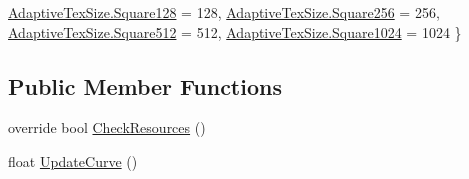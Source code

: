 \begin{DoxyCompactItemize}
\mbox{\hyperlink{class_unity_standard_assets_1_1_image_effects_1_1_tonemapping_affa06af2bce28037fc1882c70b7b2131aa5d347397bfa7f27b50411a62497793c}{Adaptive\+Tex\+Size.\+Square128}} = 128, 
\newline
\mbox{\hyperlink{class_unity_standard_assets_1_1_image_effects_1_1_tonemapping_affa06af2bce28037fc1882c70b7b2131a6f3236873f8f65d77055d9963e4573bd}{Adaptive\+Tex\+Size.\+Square256}} = 256, 
\mbox{\hyperlink{class_unity_standard_assets_1_1_image_effects_1_1_tonemapping_affa06af2bce28037fc1882c70b7b2131a66170e3867878ce0df9d4367b160b197}{Adaptive\+Tex\+Size.\+Square512}} = 512, 
\mbox{\hyperlink{class_unity_standard_assets_1_1_image_effects_1_1_tonemapping_affa06af2bce28037fc1882c70b7b2131a1028496b30aad1a6c74a169c2eb043a3}{Adaptive\+Tex\+Size.\+Square1024}} = 1024
 \}
\end{DoxyCompactItemize}
\subsection*{Public Member Functions}
\begin{DoxyCompactItemize}
\item 
override bool \mbox{\hyperlink{class_unity_standard_assets_1_1_image_effects_1_1_tonemapping_a2e9b0425c0f9ee9abe087130789ab8b8}{Check\+Resources}} ()
\item 
float \mbox{\hyperlink{class_unity_standard_assets_1_1_image_effects_1_1_tonemapping_a10e58afe7983ea449d9883cc7961f8cb}{Update\+Curve}} ()
\end{DoxyCompactItemize}
